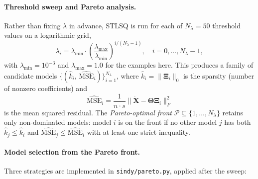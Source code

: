 \documentclass[12pt]{article}
\begin{document}
\paragraph{Threshold sweep and Pareto analysis.}
Rather than fixing $\lambda$ in advance, STLSQ is run for each of
$N_{\lambda} = 50$ threshold values on a logarithmic grid,
\begin{equation}
  \lambda_{i} = \lambda_{\min} \cdot
  \left(\frac{\lambda_{\max}}{\lambda_{\min}}\right)^{i/(N_{\lambda}-1)},
  \quad i = 0, \ldots, N_{\lambda}-1,
  \label{eq:lambda-grid}
\end{equation}
with $\lambda_{\min} = 10^{-3}$ and $\lambda_{\max} = 1.0$ for the examples
here.  This produces a family of candidate models
$\{(\hat{k}_i,\, \widehat{\mathrm{MSE}}_i)\}_{i=1}^{N_\lambda}$, where
$\hat{k}_i = \|\boldsymbol{\Xi}_i\|_0$ is the sparsity (number of nonzero
coefficients) and
\begin{equation}
  \widehat{\mathrm{MSE}}_i
  = \frac{1}{n \cdot s}
  \bigl\|\dot{\mathbf{X}} - \boldsymbol{\Theta}\boldsymbol{\Xi}_i\bigr\|_{F}^{2}
  \label{eq:mse}
\end{equation}
is the mean squared residual.  The \emph{Pareto-optimal front}
$\mathcal{P} \subseteq \{1,\ldots,N_\lambda\}$ retains only non-dominated
models: model $i$ is on the front if no other model $j$ has both
$\hat{k}_j \leq \hat{k}_i$ and $\widehat{\mathrm{MSE}}_j \leq
\widehat{\mathrm{MSE}}_i$ with at least one strict inequality.

\paragraph{Model selection from the Pareto front.}
Three strategies are implemented in \texttt{sindy/\allowbreak pareto.py},
applied after the sweep:
\end{document}
